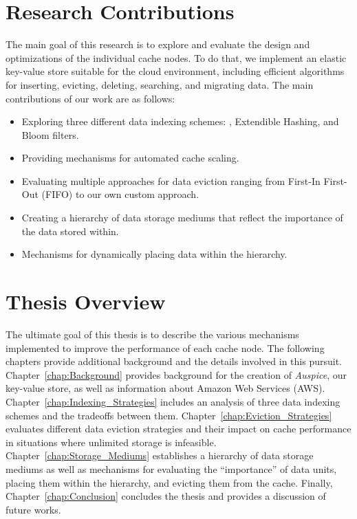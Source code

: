 \section{Research Contributions} %
\label{sec:Research_Contributions}
The main goal of this research is to explore and evaluate the design and
optimizations of the individual cache nodes. To do that, we implement an
elastic key-value store suitable for the cloud environment, including efficient
algorithms for inserting, evicting, deleting, searching, and migrating data.
The main contributions of our work are as follows:
\begin{itemize}
  \item Exploring three different data indexing schemes: \bptrees, Extendible
    Hashing, and Bloom filters.
  \item Providing mechanisms for automated cache scaling.
  \item Evaluating multiple approaches for data eviction ranging from First-In
    First-Out (FIFO) to our own custom approach.
  \item Creating a hierarchy of data storage mediums that reflect the
    importance of the data stored within.
  \item Mechanisms for dynamically placing data within the hierarchy.
\end{itemize}


\section{Thesis Overview} %
\label{sec:Thesis_Overview}
The ultimate goal of this thesis is to describe the various mechanisms
implemented to improve the performance of each cache node. The following
chapters provide additional background and the details involved in this
pursuit. Chapter~\ref{chap:Background} provides background for the creation of
\emph{Auspice}, our key-value store, as well as information about Amazon Web
Services (AWS). Chapter~\ref{chap:Indexing_Strategies} includes an analysis of
three data indexing schemes and the tradeoffs between them.
Chapter~\ref{chap:Eviction_Strategies} evaluates different data eviction
strategies and their impact on cache performance in situations where unlimited
storage is infeasible. Chapter~\ref{chap:Storage_Mediums} establishes a
hierarchy of data storage mediums as well as mechanisms for evaluating the
``importance'' of data units, placing them within the hierarchy, and evicting
them from the cache. Finally, Chapter~\ref{chap:Conclusion} concludes the
thesis and provides a discussion of future works.


